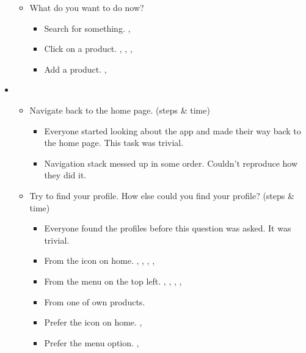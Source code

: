 \begin{itemize}
{\begin{itemize}
\begin{itemize}
						\item Search bar for finding products. , 
						\item Wasn't sure what the blue person icon meant. 
						\item {} 
					\end{itemize}
			\item What do you want to do now?
				\begin{itemize}
					\item Search for something. , 
					\item Click on a product. , , , 
					\item Add a product. , 
				\end{itemize}
		\end{itemize}
		}
		\tab
	\item {
		\begin{itemize}
			\item Navigate back to the home page. (steps \& time)
				\begin{itemize}
					\item Everyone started looking about the app and made their way back to the home page. This task was trivial.
					\item Navigation stack messed up in some order. Couldn't reproduce how they did it. 
				\end{itemize} 
			\item Try to find your profile. How else could you find your profile? (steps \& time)
				\begin{itemize}
					\item Everyone found the profiles before this question was asked. It was trivial.
					\item From the icon on home. , , , , 
					\item From the menu on the top left. , , , , 
					\item From one of own products. 
					\item Prefer the icon on home. , 
					\item Prefer the menu option. , 
					\vspace{0.5cm}
					

\end{itemize}
\end{itemize}}
\end{itemize}
